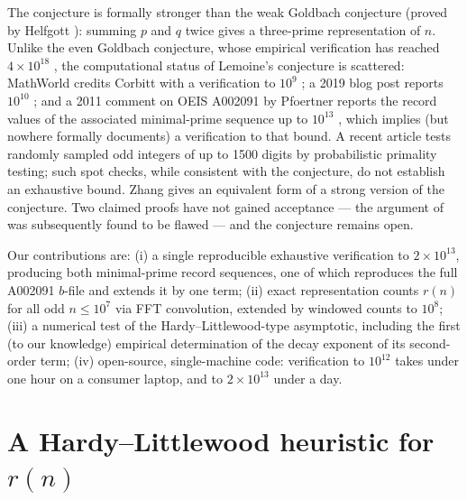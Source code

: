 \documentclass[11pt]{article}
\begin{document}
The conjecture is formally stronger than the weak Goldbach conjecture
(proved by Helfgott \cite{helfgott}): summing $p$ and $q$ twice gives a
three-prime representation of $n$. Unlike the even Goldbach conjecture,
whose empirical verification has reached $4\times10^{18}$
\cite{oesilva}, the computational status of Lemoine's conjecture is
scattered: MathWorld credits Corbitt with a verification to $10^9$
\cite{mathworld-levy}; a 2019 blog post reports $10^{10}$
\cite{brainhappy}; and a 2011 comment on OEIS A002091 by Pfoertner
reports the record values of the associated minimal-prime sequence up to
$10^{13}$ \cite{oeis2091}, which implies (but nowhere formally documents)
a verification to that bound. A recent article \cite{ndegwa} tests
randomly sampled odd integers of up to 1500 digits by probabilistic
primality testing; such spot checks, while consistent with the
conjecture, do not establish an exhaustive bound. Zhang \cite{zhang} gives an
equivalent form of a strong version of the conjecture. Two claimed
proofs \cite{agama, ghanim} have not gained acceptance --- the argument
of \cite{agama} was subsequently found to be flawed --- and the
conjecture remains open.

Our contributions are: (i) a single reproducible exhaustive verification
to $2\times10^{13}$, producing both minimal-prime record sequences, one
of which reproduces the full A002091 $b$-file and extends it by one term;
(ii) exact representation counts $r(n)$ for all odd $n\le10^7$ via FFT
convolution, extended by windowed counts to $10^8$; (iii) a numerical test of the
Hardy--Littlewood-type asymptotic, including the first (to our knowledge)
empirical determination of the decay exponent of its second-order term;
(iv) open-source, single-machine code: verification to $10^{12}$ takes
under one hour on a consumer laptop, and to $2\times10^{13}$ under a day.

\section{A Hardy--Littlewood heuristic for $r(n)$}\label{sec:heuristic}
\end{document}

